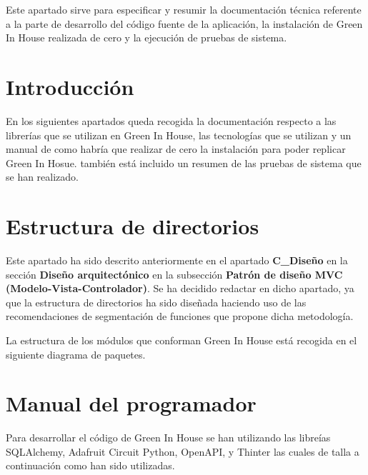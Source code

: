 Este apartado sirve para especificar y resumir la documentación técnica referente a la parte de desarrollo del código fuente de la aplicación, la instalación de Green In House realizada de cero y la ejecución de pruebas de sistema.
\section{Introducción}
En los siguientes apartados queda recogida la documentación respecto a las librerías que se utilizan en Green In House, las tecnologías que se utilizan y un manual de como habría que realizar de cero la instalación para poder replicar Green In Hosue. también está incluido un resumen de las pruebas de sistema que se han realizado.
\section{Estructura de directorios}
Este apartado ha sido descrito anteriormente en el apartado \textbf{C\_Diseño} en la sección \textbf{Diseño arquitectónico} en la subsección \textbf{Patrón de diseño MVC (Modelo-Vista-Controlador)}. Se ha decidido redactar en dicho apartado, ya que la estructura de directorios ha sido diseñada haciendo uso de las recomendaciones de segmentación de funciones que propone dicha metodología.

La estructura de los módulos que conforman Green In House está recogida en el siguiente diagrama de paquetes.

   
    
\section{Manual del programador}
Para desarrollar el código de Green In House se han utilizando las libreías SQLAlchemy, Adafruit Circuit Python, OpenAPI, y Thinter las cuales de talla a continuación como han sido utilizadas.

